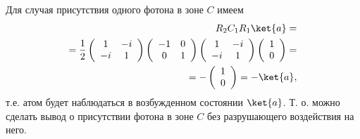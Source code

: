 Для случая присутствия одного фотона в зоне $C$ имеем
\begin{eqnarray}
  R_2 C_1 R_1 \ket{a} =
  \nonumber \\
  =
  \frac{1}{2}
  \left(
  \begin{array} {cc}
    1 & -i
    \\
    -i & 1 
  \end{array}
  \right)
  \left(
  \begin{array} {cc}
    -1 & 0
    \\
    0 & 1 
  \end{array}
  \right)
  \left(
  \begin{array} {cc}
    1 & -i
    \\
    -i & 1 
  \end{array}
  \right)
  \left(
  \begin{array} {c}
    1
    \\
    0
  \end{array}
  \right) =
  \nonumber \\
  =
  - 
  \left(
  \begin{array} {c}
    1
    \\
    0
  \end{array}
  \right) =
  - \ket{a},
  \nonumber
\end{eqnarray}
т.е. атом будет наблюдаться в возбужденном состоянии
$\ket{a}$. Т. о. можно сделать вывод о присутствии фотона в
зоне $C$ без разрушающего воздействия на него.



